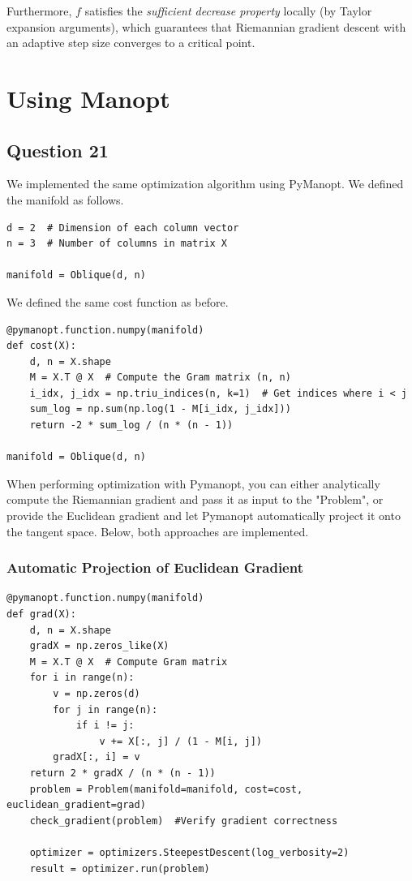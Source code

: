 \documentclass{article}
\begin{document}
Furthermore, $f$ satisfies the \textit{sufficient decrease property} locally (by Taylor expansion arguments), which guarantees that Riemannian gradient descent with an adaptive step size converges to a critical point. 



\newpage

\section*{Using Manopt}

\subsection*{Question 21}
We implemented the same optimization algorithm using PyManopt. We defined the manifold as follows. 

\begin{lstlisting}[style=Python-editor]
d = 2  # Dimension of each column vector
n = 3  # Number of columns in matrix X

manifold = Oblique(d, n)

\end{lstlisting}
We defined the same cost function as before.
\begin{lstlisting}[style=Python-editor]
@pymanopt.function.numpy(manifold)
def cost(X):
    d, n = X.shape
    M = X.T @ X  # Compute the Gram matrix (n, n)
    i_idx, j_idx = np.triu_indices(n, k=1)  # Get indices where i < j
    sum_log = np.sum(np.log(1 - M[i_idx, j_idx]))
    return -2 * sum_log / (n * (n - 1))

manifold = Oblique(d, n)

\end{lstlisting}

When performing optimization with Pymanopt, you can either analytically compute the Riemannian gradient and pass it as input to the "Problem", or provide the Euclidean gradient and let Pymanopt automatically project it onto the tangent space. Below, both approaches are implemented.
\subsubsection*{Automatic Projection of Euclidean Gradient}
\begin{lstlisting}[style=Python-editor]
@pymanopt.function.numpy(manifold)
def grad(X):
    d, n = X.shape
    gradX = np.zeros_like(X)
    M = X.T @ X  # Compute Gram matrix
    for i in range(n):
        v = np.zeros(d)
        for j in range(n):
            if i != j:
                v += X[:, j] / (1 - M[i, j])
        gradX[:, i] = v
    return 2 * gradX / (n * (n - 1))
    problem = Problem(manifold=manifold, cost=cost, euclidean_gradient=grad)
    check_gradient(problem)  #Verify gradient correctness

    optimizer = optimizers.SteepestDescent(log_verbosity=2)
    result = optimizer.run(problem)
\end{lstlisting}
\end{document}
